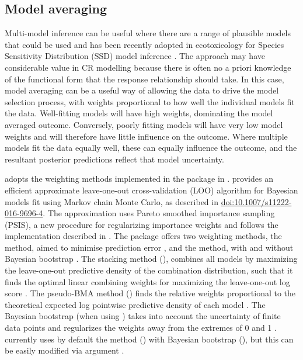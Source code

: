 \documentclass[
  shortnames]{jss}
\begin{document}
\subsection[Model averaging]{Model averaging}\label{modavg}

Multi-model inference can be useful where there are a range of plausible models that could be used \citep{Burnham2002} and has been recently adopted in ecotoxicology for Species Sensitivity Distribution (SSD) model inference \citep{Thorley2018, fox2020, Dalgarno}. The approach may have considerable value in CR modelling because there is often no a priori knowledge of the functional form that the response relationship should take. In this case, model averaging can be a useful way of allowing the data to drive the model selection process, with weights proportional to how well the individual models fit the data. Well-fitting models will have high weights, dominating the model averaged outcome. Conversely, poorly fitting models will have very low model weights and will therefore have little influence on the outcome. Where multiple models fit the data equally well, these can equally influence the outcome, and the resultant posterior predictions reflect that model uncertainty.

 adopts the weighting methods implemented in the  \citep{vehtari2020} package in .  provides an efficient approximate leave-one-out cross-validation (LOO) algorithm for Bayesian models fit using Markov chain Monte Carlo, as described in \citep{vehtari2017} \url{doi:10.1007/s11222-016-9696-4}. The approximation uses Pareto smoothed importance sampling (PSIS), a new procedure for regularizing importance weights and follows the implementation described in \citep{Vehtari2019}. The  package offers two weighting methods, the  method, aimed to minimise prediction error \citep{Yao2018}, and the  method, with and without Bayesian bootstrap \citep{vehtari2020, vehtari2017}. The stacking method (), combines all models by maximizing the leave-one-out predictive density of the combination distribution, such that it finds the optimal linear combining weights for maximizing the leave-one-out log score \citep{vehtari2020}. The pseudo-BMA method () finds the relative weights proportional to the theoretical expected log pointwise predictive density of each model \citep{vehtari2020}. The Bayesian bootstrap (when using ) takes into account the uncertainty of finite data points and regularizes the weights away from the extremes of 0 and 1 \citep{vehtari2020}.  currently uses by default the  method () with Bayesian bootstrap (), but this can be easily modified via argument .
\end{document}
